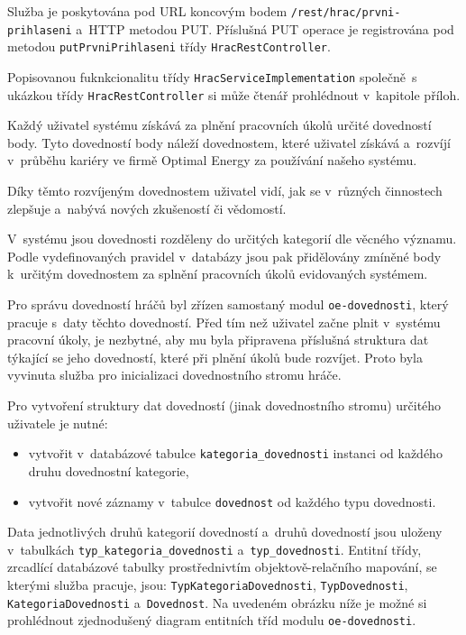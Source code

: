 \documentclass[twoside, 12pt]{article}
\begin{document}
{Služba je poskytována pod URL koncovým bodem \texttt{/rest/hrac/prvni-prihlaseni} a~HTTP metodou PUT.
Příslušná PUT operace je registrována pod metodou \texttt{putPrvniPrihlaseni} třídy \texttt{HracRestController}.

Popisovanou fuknkcionalitu třídy \texttt{HracServiceImplementation} společně~s ukázkou třídy \texttt{HracRestController}
si může čtenář prohlédnout v~kapitole příloh.

\clearpage


Každý uživatel systému získává za plnění pracovních úkolů určité dovedností body.
Tyto dovedností body náleží dovednostem, které uživatel získává a~rozvíjí
v~průběhu kariéry ve firmě Optimal Energy za používání našeho systému.

Díky těmto rozvíjeným dovednostem uživatel vidí,
jak se v~různých činnostech zlepšuje a~nabývá nových zkušeností či vědomostí.

V~systému jsou dovednosti rozděleny do určitých kategorií dle věcného významu.
Podle vydefinovaných pravidel v~databázy jsou pak přidělovány
zmíněné body k~určitým dovednostem za splnění pracovních úkolů evidovaných systémem.

Pro správu dovedností hráčů byl zřízen samostaný modul \texttt{oe-dovednosti},
který pracuje s~daty těchto dovedností.
Před tím než uživatel začne plnit v~systému pracovní úkoly, je nezbytné,
aby mu byla připravena příslušná struktura dat týkající se jeho dovedností,
které při plnění úkolů bude rozvíjet.
Proto byla vyvinuta služba pro inicializaci dovednostního stromu hráče.

Pro vytvoření struktury dat dovedností (jinak dovednostního stromu) určitého uživatele je nutné:

\begin{itemize}

\item vytvořit v~databázové tabulce \texttt{kategoria\_dovednosti} instanci od každého druhu dovednostní     kategorie,
\item vytvořit nové záznamy v~tabulce \texttt{dovednost} od každého typu dovednosti.
\end{itemize}

Data jednotlivých druhů kategorií dovedností a~druhů dovedností jsou
uloženy v~tabulkách \texttt{typ\_kategoria\_dovednosti} a~\texttt{typ\_dovednosti}.
Entitní třídy, zrcadlící databázové tabulky prostřednivtím objektově-relačního mapování,
se kterými služba pracuje, jsou:
\texttt{TypKategoriaDovednosti}, \texttt{TypDovednosti}, \texttt{KategoriaDovednosti} a~\texttt{Dovednost}.
Na uvedeném obrázku níže je možné si prohlédnout zjednodušený diagram entitních tříd modulu \texttt{oe-dovednosti}.

}
\end{document}
